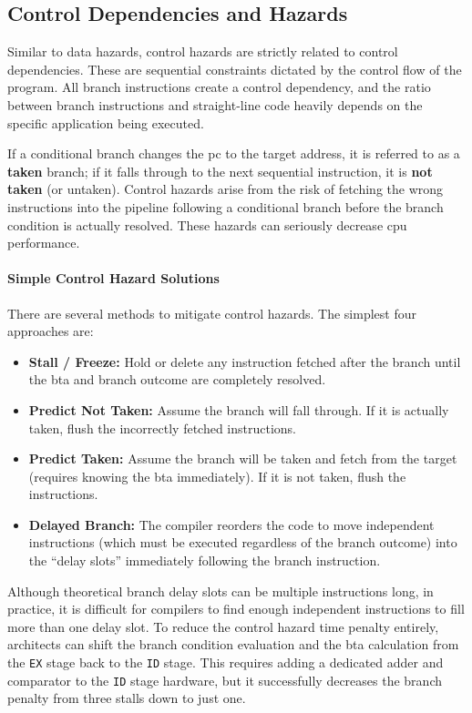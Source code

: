 \subsection{Control Dependencies and Hazards}
Similar to data hazards, control hazards are strictly related to control dependencies. These are sequential constraints dictated by the control flow of the program. All branch instructions create a control dependency, and the ratio between branch instructions and straight-line code heavily depends on the specific application being executed. 

\noindent If a conditional branch changes the \gls{pc} to the target address, it is referred to as a \textbf{taken} branch; if it falls through to the next sequential instruction, it is \textbf{not taken} (or untaken). Control hazards arise from the risk of fetching the wrong instructions into the pipeline following a conditional branch before the branch condition is actually resolved. These hazards can seriously decrease \gls{cpu} performance.

\paragraph{Simple Control Hazard Solutions} 
There are several methods to mitigate control hazards. The simplest four approaches are:
\begin{itemize}
    \item \textbf{Stall / Freeze:} Hold or delete any instruction fetched after the branch until the \gls{bta} and branch outcome are completely resolved.
    \item \textbf{Predict Not Taken:} Assume the branch will fall through. If it is actually taken, flush the incorrectly fetched instructions.
    \item \textbf{Predict Taken:} Assume the branch will be taken and fetch from the target (requires knowing the \gls{bta} immediately). If it is not taken, flush the instructions.
    \item \textbf{Delayed Branch:} The compiler reorders the code to move independent instructions (which must be executed regardless of the branch outcome) into the ``delay slots'' immediately following the branch instruction.
\end{itemize}

Although theoretical branch delay slots can be multiple instructions long, in practice, it is difficult for compilers to find enough independent instructions to fill more than one delay slot. To reduce the control hazard time penalty entirely, architects can shift the branch condition evaluation and the \gls{bta} calculation from the \texttt{EX} stage back to the \texttt{ID} stage. This requires adding a dedicated adder and comparator to the \texttt{ID} stage hardware, but it successfully decreases the branch penalty from three stalls down to just one.

